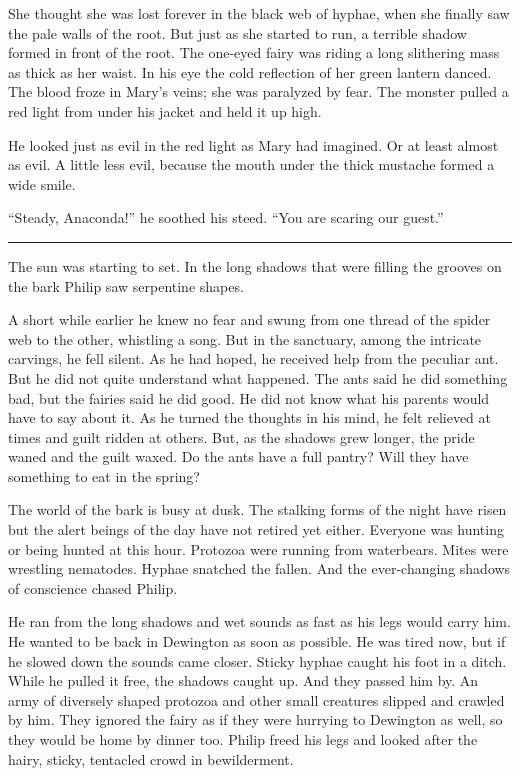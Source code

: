 \documentclass[10pt, draft]{memoir}
\renewcommand{\pfbreakdisplay}{\bigskip \ding{166} \bigskip}
\newcommand{\secbreak}{\fancybreak{\pfbreakdisplay}}
\begin{document}
She thought she was lost forever in the black web of hyphae, when she finally saw the pale walls of the root. But just as she started to run, a terrible shadow formed in front of the root. The one-eyed fairy was riding a long slithering mass as thick as her waist. In his eye the cold reflection of her green lantern danced. The blood froze in Mary's veins; she was paralyzed by fear. The monster pulled a red light from under his jacket and held it up high.

He looked just as evil in the red light as Mary had imagined. Or at least almost as evil. A little less evil, because the mouth under the thick mustache formed a wide smile.

``Steady, Anaconda!'' he soothed his steed. ``You are scaring our guest.''

\secbreak

The sun was starting to set. In the long shadows that were filling the grooves on the bark Philip saw serpentine shapes.

A short while earlier he knew no fear and swung from one thread of the spider web to the other, whistling a song. But in the sanctuary, among the intricate carvings, he fell silent. As he had hoped, he received help from the peculiar ant. But he did not quite understand what happened. The ants said he did something bad, but the fairies said he did good. He did not know what his parents would have to say about it. As he turned the thoughts in his mind, he felt relieved at times and guilt ridden at others. But, as the shadows grew longer, the pride waned and the guilt waxed. Do the ants have a full pantry? Will they have something to eat in the spring?

The world of the bark is busy at dusk. The stalking forms of the night have risen but the alert beings of the day have not retired yet either. Everyone was hunting or being hunted at this hour. Protozoa were running from waterbears. Mites were wrestling nematodes. Hyphae snatched the fallen. And the ever-changing shadows of conscience chased Philip.

He ran from the long shadows and wet sounds as fast as his legs would carry him. He wanted to be back in Dewington as soon as possible. He was tired now, but if he slowed down the sounds came closer. Sticky hyphae caught his foot in a ditch. While he pulled it free, the shadows caught up. And they passed him by. An army of diversely shaped protozoa and other small creatures slipped and crawled by him. They ignored the fairy as if they were hurrying to Dewington as well, so they would be home by dinner too. Philip freed his legs and looked after the hairy, sticky, tentacled crowd in bewilderment.
\end{document}

